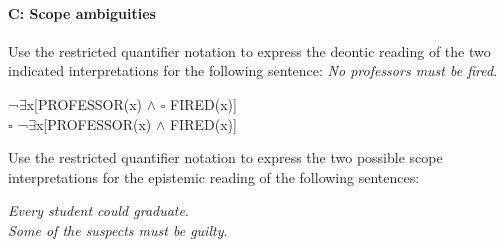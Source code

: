 \paragraph*{C: Scope ambiguities}
\begin{exe}
 \ex \begin{xlisti}
  \ex Use the restricted quantifier notation to express the deontic reading of the two indicated interpretations for the following sentence: 
  \textit{No professors must be fired}.\\
  \begin{xlisti}
    \ex ¬${\exists}$x[PROFESSOR(x) $\wedge$ ${\square}$ FIRED(x)]\\
    \ex ${\square}$ ¬${\exists}$x[PROFESSOR(x) $\wedge$ FIRED(x)]
  \end{xlisti}
\ex  Use the restricted quantifier notation to express the two possible scope interpretations for the epistemic reading of the following sentences:\\
\begin{xlista}
 \ex \textit{Every student could graduate}.\\
 \ex \textit{Some of the suspects must be guilty}.
\end{xlista}
\end{xlisti}
\end{exe}